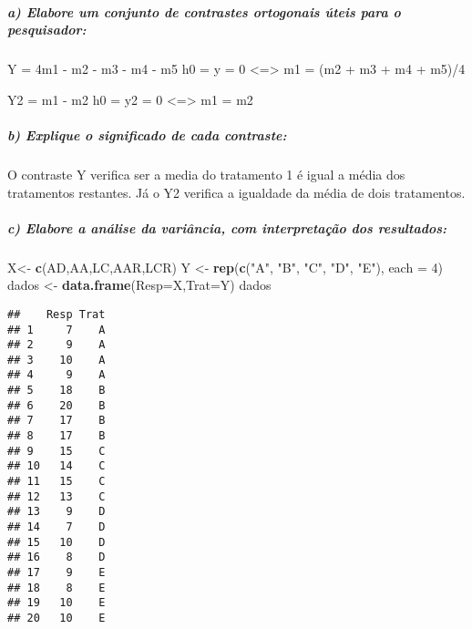 \documentclass[
]{article}
\newenvironment{Shaded}{\begin{snugshade}}{\end{snugshade}}
\newcommand{\AttributeTok}[1]{\textcolor[rgb]{0.13,0.29,0.53}{#1}}
\newcommand{\DecValTok}[1]{\textcolor[rgb]{0.00,0.00,0.81}{#1}}
\newcommand{\FunctionTok}[1]{\textcolor[rgb]{0.13,0.29,0.53}{\textbf{#1}}}
\newcommand{\NormalTok}[1]{#1}
\newcommand{\OtherTok}[1]{\textcolor[rgb]{0.56,0.35,0.01}{#1}}
\newcommand{\SpecialCharTok}[1]{\textcolor[rgb]{0.81,0.36,0.00}{\textbf{#1}}}
\newcommand{\StringTok}[1]{\textcolor[rgb]{0.31,0.60,0.02}{#1}}
\begin{document}
\hypertarget{a-elabore-um-conjunto-de-contrastes-ortogonais-uxfateis-para-o-pesquisador}{%
\subparagraph{a) Elabore um conjunto de contrastes ortogonais úteis para
o
pesquisador:}\label{a-elabore-um-conjunto-de-contrastes-ortogonais-uxfateis-para-o-pesquisador}}

Y = 4m1 - m2 - m3 - m4 - m5 h0 = y = 0 \textless=\textgreater{} m1 = (m2
+ m3 + m4 + m5)/4

Y2 = m1 - m2 h0 = y2 = 0 \textless=\textgreater{} m1 = m2

\hypertarget{b-explique-o-significado-de-cada-contraste}{%
\subparagraph{b) Explique o significado de cada
contraste:}\label{b-explique-o-significado-de-cada-contraste}}

O contraste Y verifica ser a media do tratamento 1 é igual a média dos
tratamentos restantes. Já o Y2 verifica a igualdade da média de dois
tratamentos.

\hypertarget{c-elabore-a-anuxe1lise-da-variuxe2ncia-com-interpretauxe7uxe3o-dos-resultados}{%
\subparagraph{c) Elabore a análise da variância, com interpretação dos
resultados:}\label{c-elabore-a-anuxe1lise-da-variuxe2ncia-com-interpretauxe7uxe3o-dos-resultados}}

\begin{Shaded}
\begin{Highlighting}[]
\NormalTok{X}\OtherTok{\textless{}{-}} \FunctionTok{c}\NormalTok{(AD,AA,LC,AAR,LCR)}
\NormalTok{Y }\OtherTok{\textless{}{-}} \FunctionTok{rep}\NormalTok{(}\FunctionTok{c}\NormalTok{(}\StringTok{"A"}\NormalTok{, }\StringTok{"B"}\NormalTok{, }\StringTok{"C"}\NormalTok{, }\StringTok{"D"}\NormalTok{, }\StringTok{"E"}\NormalTok{), }\AttributeTok{each =} \DecValTok{4}\NormalTok{)}
\NormalTok{dados }\OtherTok{\textless{}{-}} \FunctionTok{data.frame}\NormalTok{(}\AttributeTok{Resp=}\NormalTok{X,}\AttributeTok{Trat=}\NormalTok{Y)}
\NormalTok{dados}
\end{Highlighting}
\end{Shaded}

\begin{verbatim}
##    Resp Trat
## 1     7    A
## 2     9    A
## 3    10    A
## 4     9    A
## 5    18    B
## 6    20    B
## 7    17    B
## 8    17    B
## 9    15    C
## 10   14    C
## 11   15    C
## 12   13    C
## 13    9    D
## 14    7    D
## 15   10    D
## 16    8    D
## 17    9    E
## 18    8    E
## 19   10    E
## 20   10    E
\end{verbatim}

\begin{Shaded}
\end{Shaded}
\end{document}
